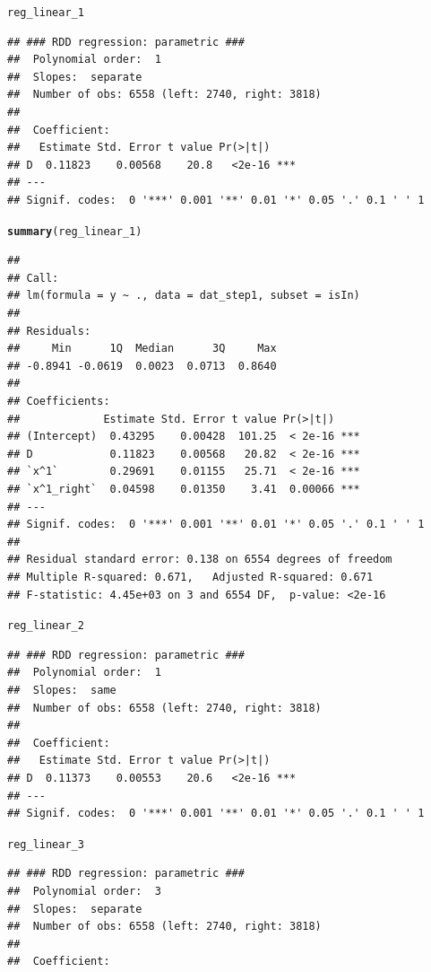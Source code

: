 \documentclass[english,nojss]{jss}\usepackage{graphicx, color}
\makeatletter
\newcommand{\hlfunctioncall}[1]{\textcolor[rgb]{0.501960784313725,0,0.329411764705882}{\textbf{#1}}}%
\newenvironment{kframe}{%
 \def\at@end@of@kframe{}%
 \ifinner\ifhmode%
  \def\at@end@of@kframe{\end{minipage}}%
  \begin{minipage}{\columnwidth}%
 \fi\fi%
 \def\FrameCommand##1{\hskip\@totalleftmargin \hskip-\fboxsep
 \colorbox{shadecolor}{##1}\hskip-\fboxsep
     \hskip-\linewidth \hskip-\@totalleftmargin \hskip\columnwidth}%
 \MakeFramed {\advance\hsize-\width
   \@totalleftmargin\z@ \linewidth\hsize
   \@setminipage}}%
 {\par\unskip\endMakeFramed%
 \at@end@of@kframe}
\newenvironment{knitrout}{}{} %
\makeatother
\begin{document}
\begin{knitrout}
\color{fgcolor}\begin{kframe}
\begin{alltt}
reg_linear_1
\end{alltt}
\begin{verbatim}
## ### RDD regression: parametric ###
## 	Polynomial order:  1 
## 	Slopes:  separate 
## 	Number of obs: 6558 (left: 2740, right: 3818)
## 
## 	Coefficient:
##   Estimate Std. Error t value Pr(>|t|)    
## D  0.11823    0.00568    20.8   <2e-16 ***
## ---
## Signif. codes:  0 '***' 0.001 '**' 0.01 '*' 0.05 '.' 0.1 ' ' 1
\end{verbatim}
\begin{alltt}
\hlfunctioncall{summary}(reg_linear_1)
\end{alltt}
\begin{verbatim}
## 
## Call:
## lm(formula = y ~ ., data = dat_step1, subset = isIn)
## 
## Residuals:
##     Min      1Q  Median      3Q     Max 
## -0.8941 -0.0619  0.0023  0.0713  0.8640 
## 
## Coefficients:
##             Estimate Std. Error t value Pr(>|t|)    
## (Intercept)  0.43295    0.00428  101.25  < 2e-16 ***
## D            0.11823    0.00568   20.82  < 2e-16 ***
## `x^1`        0.29691    0.01155   25.71  < 2e-16 ***
## `x^1_right`  0.04598    0.01350    3.41  0.00066 ***
## ---
## Signif. codes:  0 '***' 0.001 '**' 0.01 '*' 0.05 '.' 0.1 ' ' 1 
## 
## Residual standard error: 0.138 on 6554 degrees of freedom
## Multiple R-squared: 0.671,	Adjusted R-squared: 0.671 
## F-statistic: 4.45e+03 on 3 and 6554 DF,  p-value: <2e-16
\end{verbatim}
\begin{alltt}
reg_linear_2
\end{alltt}
\begin{verbatim}
## ### RDD regression: parametric ###
## 	Polynomial order:  1 
## 	Slopes:  same 
## 	Number of obs: 6558 (left: 2740, right: 3818)
## 
## 	Coefficient:
##   Estimate Std. Error t value Pr(>|t|)    
## D  0.11373    0.00553    20.6   <2e-16 ***
## ---
## Signif. codes:  0 '***' 0.001 '**' 0.01 '*' 0.05 '.' 0.1 ' ' 1
\end{verbatim}
\begin{alltt}
reg_linear_3
\end{alltt}
\begin{verbatim}
## ### RDD regression: parametric ###
## 	Polynomial order:  3 
## 	Slopes:  separate 
## 	Number of obs: 6558 (left: 2740, right: 3818)
## 
## 	Coefficient:

\end{verbatim}
\end{kframe}
\end{knitrout}
\end{document}
